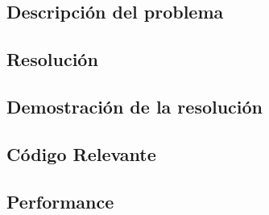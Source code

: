 \subsection{Descripci\'on del problema}

\newpage

\subsection{Resoluci\'on}

\newpage

\subsection{Demostraci\'on de la resoluci\'on}

\newpage

\subsection{C\'odigo Relevante}

\newpage

\subsection{Performance}

\newpage